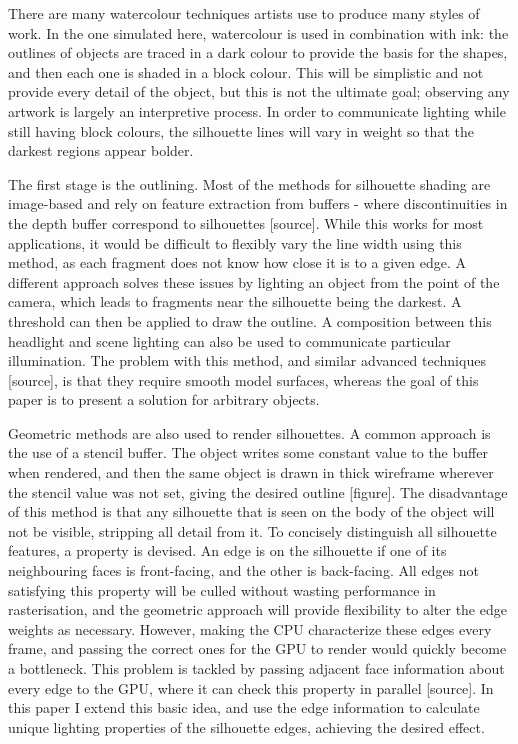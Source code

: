 \documentclass[a4paper, 12pt]{article}
\begin{document}
There are many watercolour techniques artists use to produce many styles of work. In the one simulated here, watercolour is used in combination with ink: the outlines of objects are traced in a dark colour to provide the basis for the shapes, and then each one is shaded in a block colour. This will be simplistic and not provide every detail of the object, but this is not the ultimate goal; observing any artwork is largely an interpretive process. In order to communicate lighting while still having block colours, the silhouette lines will vary in weight so that the darkest regions appear bolder.

The first stage is the outlining. Most of the methods for silhouette shading are image-based and rely on feature extraction from buffers - where discontinuities in the depth buffer correspond to silhouettes [source]. While this works for most applications, it would be difficult to flexibly vary the line width using this method, as each fragment does not know how close it is to a given edge. A different approach solves these issues by lighting an object from the point of the camera, which leads to fragments near the silhouette being the darkest. A threshold can then be applied to draw the outline. A composition between this headlight and scene lighting can also be used to communicate particular illumination. The problem with this method, and similar advanced techniques [source], is that they require smooth model surfaces, whereas the goal of this paper is to present a solution for arbitrary objects.

Geometric methods are also used to render silhouettes. A common approach is the use of a stencil buffer. The object writes some constant value to the buffer when rendered, and then the same object is drawn in thick wireframe wherever the stencil value was not set, giving the desired outline [figure]. The disadvantage of this method is that any silhouette that is seen on the body of the object will not be visible, stripping all detail from it. To concisely distinguish all silhouette features, a property is devised. An edge is on the silhouette if one of its neighbouring faces is front-facing, and the other is back-facing. All edges not satisfying this property will be culled without wasting performance in rasterisation, and the geometric approach will provide flexibility to alter the edge weights as necessary. However, making the CPU characterize these edges every frame, and passing the correct ones for the GPU to render would quickly become a bottleneck. This problem is tackled by passing adjacent face information about every edge to the GPU, where it can check this property in parallel [source]. In this paper I extend this basic idea, and use the edge information to calculate unique lighting properties of the silhouette edges, achieving the desired effect.
\end{document}
